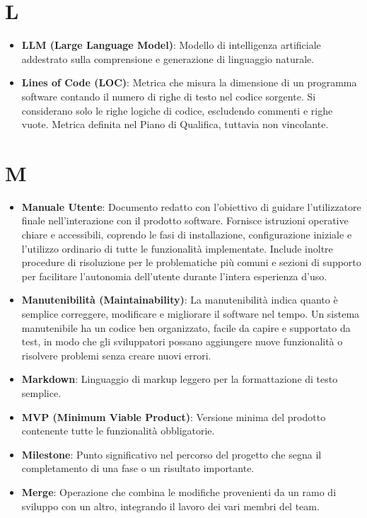 \documentclass[11pt,a4paper]{article}
\begin{document}
\section*{L}
\begin{itemize}
\item \textbf{LLM (Large Language Model)}: Modello di intelligenza artificiale addestrato sulla comprensione e generazione di linguaggio naturale.

\item \textbf{Lines of Code (LOC)}: Metrica che misura la dimensione di un programma software contando il numero di righe di testo nel codice sorgente. Si considerano solo le righe logiche di codice, escludendo commenti e righe vuote. Metrica definita nel Piano di Qualifica, tuttavia non vincolante.
\end{itemize}
\newpage

\section*{M}
\begin{itemize}
\item \textbf{Manuale Utente}: Documento redatto con l'obiettivo di 
guidare l'utilizzatore finale nell'interazione con il prodotto software. Fornisce istruzioni operative chiare e accessibili, coprendo le fasi di installazione, configurazione iniziale e l'utilizzo ordinario di tutte le funzionalità implementate. Include inoltre procedure di risoluzione per le problematiche più comuni e sezioni di supporto per facilitare l'autonomia 
dell'utente durante l'intera esperienza d'uso.

\item \textbf{Manutenibilità (Maintainability)}: La manutenibilità indica quanto è semplice correggere, modificare e migliorare il software nel tempo. Un sistema manutenibile ha un codice ben organizzato, facile da capire e supportato da test, in modo che gli sviluppatori possano aggiungere nuove funzionalità o risolvere problemi senza creare nuovi errori.

\item \textbf{Markdown}: Linguaggio di markup leggero per la formattazione di testo semplice.

\item \textbf{MVP (Minimum Viable Product)}: Versione minima del prodotto contenente tutte le funzionalità obbligatorie.

\item \textbf{Milestone}: Punto significativo nel percorso del progetto che segna il completamento di una fase o un risultato importante.

\item \textbf{Merge}: Operazione che combina le modifiche provenienti da un ramo di sviluppo con un altro, integrando il lavoro dei vari membri del team.

\end{itemize}
\newpage
\end{document}
